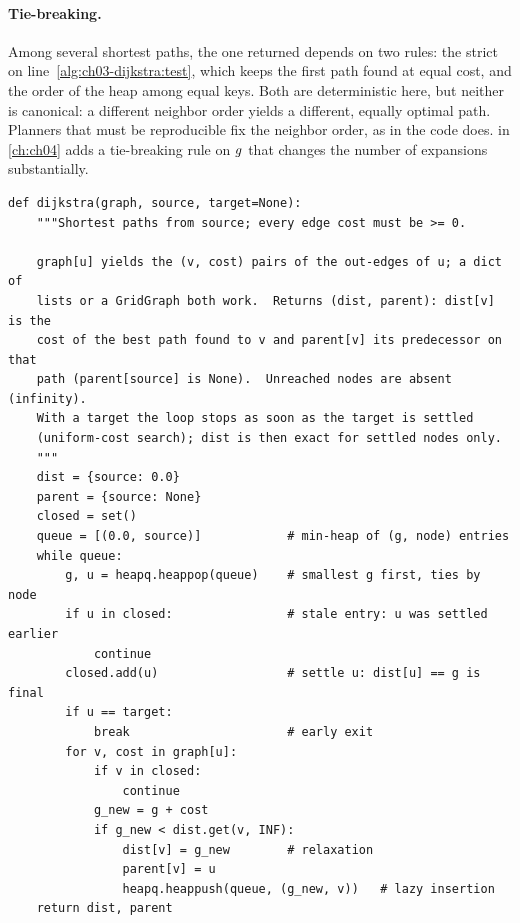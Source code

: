 \paragraph{Tie-breaking.} Among several shortest paths, the one returned
depends on two rules: the strict \code{<} on line~\ref{alg:ch03-dijkstra:test}, which keeps the
first path found at equal cost, and the order of the heap among equal keys. Both are
deterministic here, but neither is canonical: a different neighbor order yields a different,
equally optimal path. Planners that must be reproducible fix the neighbor order, as
 in the code does. \astar in \cref{ch:ch04} adds a tie-breaking rule on $g$
that changes the number of expansions substantially.

\begin{lstlisting}[caption={The core of the implementation (from \code{code/ch03\_dijkstra.py}): the main loop with \code{heapq}, a dictionary of tentative costs, a closed set tested on every pop, and lazy insertion instead of decrease-key.},label={lst:ch03-core}]
def dijkstra(graph, source, target=None):
    """Shortest paths from source; every edge cost must be >= 0.

    graph[u] yields the (v, cost) pairs of the out-edges of u; a dict of
    lists or a GridGraph both work.  Returns (dist, parent): dist[v] is the
    cost of the best path found to v and parent[v] its predecessor on that
    path (parent[source] is None).  Unreached nodes are absent (infinity).
    With a target the loop stops as soon as the target is settled
    (uniform-cost search); dist is then exact for settled nodes only.
    """
    dist = {source: 0.0}
    parent = {source: None}
    closed = set()
    queue = [(0.0, source)]            # min-heap of (g, node) entries
    while queue:
        g, u = heapq.heappop(queue)    # smallest g first, ties by node
        if u in closed:                # stale entry: u was settled earlier
            continue
        closed.add(u)                  # settle u: dist[u] == g is final
        if u == target:
            break                      # early exit
        for v, cost in graph[u]:
            if v in closed:
                continue
            g_new = g + cost
            if g_new < dist.get(v, INF):
                dist[v] = g_new        # relaxation
                parent[v] = u
                heapq.heappush(queue, (g_new, v))   # lazy insertion
    return dist, parent
\end{lstlisting}

